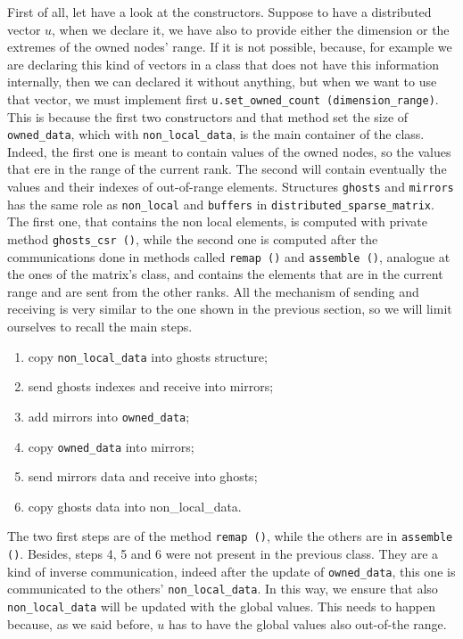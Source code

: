 First of all, let have a look at the constructors. Suppose to have a distributed vector $ u $, when we declare it, we have also to provide either the dimension or the extremes of the owned nodes' range. If it is not possible, because, for example we are declaring this kind of vectors in a class that does not have this information internally, then we can declared it without anything, but when we want to use that vector, we must implement first \texttt{u.set\_owned\_count (dimension\_range)}. This is because the first two constructors and that method set the size of \texttt{owned\_data}, which with \texttt{non\_local\_data}, is the main container of the class. Indeed, the first one is meant to contain values of the owned nodes, so the values that ere in the range of the current rank. The second will contain eventually the values and their indexes of out-of-range elements. Structures \texttt{ghosts} and \texttt{mirrors} has the same role as \texttt{non\_local} and \texttt{buffers} in \texttt{distributed\_sparse\_matrix}. The first one, that contains the non local elements, is computed  with private method \texttt{ghosts\_csr ()}, while the second one is computed after the communications done in methods called \texttt{remap ()} and \texttt{assemble ()}, analogue at the ones of the matrix's class, and contains the elements that are in the current range and are sent from the other ranks. All the mechanism of sending and receiving is very similar to the one shown in the previous section, so we will limit ourselves to recall the main steps. 
\begin{enumerate}
	\item  copy \texttt{non\_local\_data} into ghosts structure;
	\item  send ghosts indexes and receive into mirrors;
	\item add mirrors into \texttt{owned\_data};
	\item copy \texttt{owned\_data} into mirrors;
	\item send mirrors data and receive into ghosts;
	\item copy ghosts data into non\_local\_data.
\end{enumerate}
The two first steps are of the method \texttt{remap ()}, while the others are in \texttt{assemble ()}. Besides, steps 4, 5 and 6 were not present in the previous class. They are a kind of inverse communication, indeed after the update of \texttt{owned\_data}, this one is communicated to the others' \texttt{non\_local\_data}. In this way, we ensure that also \texttt{non\_local\_data} will be updated with the global values. This needs to happen because, as we said before, $ u $ has to have the global values also out-of-the range.\\
